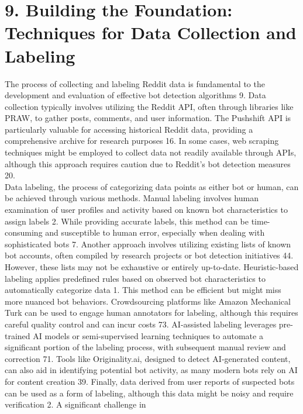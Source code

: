 \documentclass[
  12pt,
  letterpaper,
  DIV=11,
  numbers=noendperiod]{scrartcl}
\begin{document}
\section{\texorpdfstring{\textbf{9. Building the Foundation: Techniques
for Data Collection and
Labeling}}{9. Building the Foundation: Techniques for Data Collection and Labeling}}\label{building-the-foundation-techniques-for-data-collection-and-labeling}

The process of collecting and labeling Reddit data is fundamental to the
development and evaluation of effective bot detection algorithms 9. Data
collection typically involves utilizing the Reddit API, often through
libraries like PRAW, to gather posts, comments, and user information.
The Pushshift API is particularly valuable for accessing historical
Reddit data, providing a comprehensive archive for research purposes 16.
In some cases, web scraping techniques might be employed to collect data
not readily available through APIs, although this approach requires
caution due to Reddit's bot detection measures 20.\\
Data labeling, the process of categorizing data points as either bot or
human, can be achieved through various methods. Manual labeling involves
human examination of user profiles and activity based on known bot
characteristics to assign labels 2. While providing accurate labels,
this method can be time-consuming and susceptible to human error,
especially when dealing with sophisticated bots 7. Another approach
involves utilizing existing lists of known bot accounts, often compiled
by research projects or bot detection initiatives 44. However, these
lists may not be exhaustive or entirely up-to-date. Heuristic-based
labeling applies predefined rules based on observed bot characteristics
to automatically categorize data 1. This method can be efficient but
might miss more nuanced bot behaviors. Crowdsourcing platforms like
Amazon Mechanical Turk can be used to engage human annotators for
labeling, although this requires careful quality control and can incur
costs 73. AI-assisted labeling leverages pre-trained AI models or
semi-supervised learning techniques to automate a significant portion of
the labeling process, with subsequent manual review and correction 71.
Tools like Originality.ai, designed to detect AI-generated content, can
also aid in identifying potential bot activity, as many modern bots rely
on AI for content creation 39. Finally, data derived from user reports
of suspected bots can be used as a form of labeling, although this data
might be noisy and require verification 2. A significant challenge in
\end{document}
